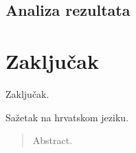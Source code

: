 \documentclass[times, utf8, diplomski, numeric]{fer}
\begin{document}
\section{Analiza rezultata}


\chapter{Zaključak}
Zaključak.




\begin{sazetak}
Sažetak na hrvatskom jeziku.

\end{sazetak}

\begin{abstract}
Abstract.

\end{abstract}
\end{document}
